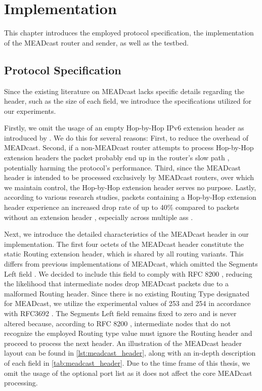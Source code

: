 \chapter{Implementation} %
\label{chap:Implementation}
This chapter introduces the employed protocol specification, the implementation
    of the MEADcast router and sender, as well as the testbed.

\section{Protocol Specification} %
Since the existing literature on MEADcast lacks specific details regarding the
    header, such as the size of each field, we introduce the
    specifications utilized for our experiments.

Firstly, we omit the usage of an empty Hop-by-Hop IPv6 extension header as
    introduced by \citeauthor{meadcast1} \cite{meadcast1, meadcast2}.
We do this for several reasons:
First, to reduce the overhead of MEADcast.
Second, if a non-MEADcast router attempts to process Hop-by-Hop extension headers
    the packet probably end up in the router's slow path \cite{rfc7045}, potentially
    harming the protocol's performance.
Third, since the MEADcast header is intended to be processed exclusively by
    MEADcast routers, over which we maintain control, the Hop-by-Hop extension
    header serves no purpose.
Lastly, according to various research studies, packets containing a Hop-by-Hop
    extension header experience an increased drop rate of up to 40\% compared
    to packets without an extension header \cite{rfc7872_ext_hdrs_drop_rate},
    especially across multiple \glspl{as} \cite{rfc9098_ext_hdrs_op_impl, rfc9288}.

Next, we introduce the detailed characteristics of the MEADcast header in our
    implementation.
The first four octets of the MEADcast header constitute the static Routing
    extension header, which is shared by all routing variants.
This differs from previous implementations of MEADcast, which omitted the
    Segments Left field \cite{sdn_ba}.
We decided to include this field to comply with RFC 8200
    \cite{rfc8200_ipv6_hdr}, reducing the likelihood that intermediate nodes
    drop MEADcast packets due to a malformed Routing header.
Since there is no existing Routing Type designated for MEADcast, we utilize the
    experimental values of 253 and 254 in accordance with RFC3692
    \cite{rfc3692_ipv6_rt_type}.
The Segments Left field remains fixed to zero and is never altered because,
    according to RFC 8200 \cite{rfc8200_ipv6_hdr}, intermediate nodes that do
    not recognize the employed Routing type value must ignore the Routing
    header and proceed to process the next header.
An illustration of the MEADcast header layout can be found in
    \autoref{lst:meadcast_header}, along with an in-depth description of each
    field in \autoref{tab:meadcast_header}.
Due to the time frame of this thesis, we omit the usage of the optional port
    list as it does not affect the core MEADcast processing.


